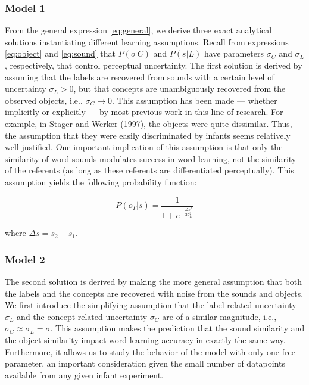 \documentclass[english,,man,floatsintext]{apa6}
\theoremstyle{definition}
\theoremstyle{definition}
\theoremstyle{definition}
\theoremstyle{remark}
\begin{document}
\subsubsection{Model 1}\label{model-1}

From the general expression \ref{eq:general}, we derive three exact
analytical solutions instantiating different learning assumptions.
Recall from expressions \ref{eq:object} and \ref{eq:sound} that
\(P(o|C)\) and \(P(s|L)\) have parameters \(\sigma_C\) and \(\sigma_L\),
respectively, that control perceptual uncertainty. The first solution is
derived by assuming that the labels are recovered from sounds with a
certain level of uncertainty \(\sigma_L > 0\), but that concepts are
unambiguously recovered from the observed objects, i.e.,
\(\sigma_C \rightarrow 0\). This assumption has been made --- whether
implicitly or explicitly --- by most previous work in this line of
research. For example, in Stager and Werker (1997), the objects were
quite dissimilar. Thus, the assumption that they were easily
discriminated by infants seems relatively well justified. One important
implication of this assumption is that only the similarity of word
sounds modulates success in word learning, not the similarity of the
referents (as long as these referents are differentiated perceptually).
This assumption yields the following probability function:

\begin{equation} \label{eq:model1}
P(o_T|s)= \frac{1}{1 + e^{-\frac{\Delta s^2}{2\sigma_L^2}}}
\end{equation}

where \(\Delta s = s_2-s_1\).

\subsubsection{Model 2}\label{model-2}

The second solution is derived by making the more general assumption
that both the labels and the concepts are recovered with noise from the
sounds and objects. We first introduce the simplifying assumption that
the label-related uncertainty \(\sigma_L\) and the concept-related
uncertainty \(\sigma_C\) are of a similar magnitude, i.e.,
\(\sigma_C \approx \sigma_L = \sigma\). This assumption makes the
prediction that the sound similarity and the object similarity impact
word learning accuracy in exactly the same way. Furthermore, it allows
us to study the behavior of the model with only one free parameter, an
important consideration given the small number of datapoints available
from any given infant experiment.
\end{document}
